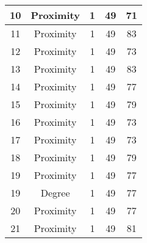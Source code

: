 \documentclass[results.tex]{subfiles}
\begin{document}
\begin{center}
\begin{tabular}{| c || c | c | c | c |}
            \hline
            10                      & Proximity                    & 1                      & 49                      & 71                   \\
            \hline
            11                      & Proximity                    & 1                      & 49                      & 83                   \\
            \hline
            12                      & Proximity                    & 1                      & 49                      & 73                   \\
            \hline
            13                      & Proximity                    & 1                      & 49                      & 83                   \\
            \hline
            14                      & Proximity                    & 1                      & 49                      & 77                   \\
            \hline
            15                      & Proximity                    & 1                      & 49                      & 79                   \\
            \hline
            16                      & Proximity                    & 1                      & 49                      & 73                   \\
            \hline
            17                      & Proximity                    & 1                      & 49                      & 73                   \\
            \hline
            18                      & Proximity                    & 1                      & 49                      & 79                   \\
            \hline
            19                      & Proximity                    & 1                      & 49                      & 77                   \\
            \hline
            19                      & Degree                       & 1                      & 49                      & 77                   \\
            \hline
            20                      & Proximity                    & 1                      & 49                      & 77                   \\
            \hline
            21                      & Proximity                    & 1                      & 49                      & 81                   \\

\end{tabular}
\end{center}
\end{document}
